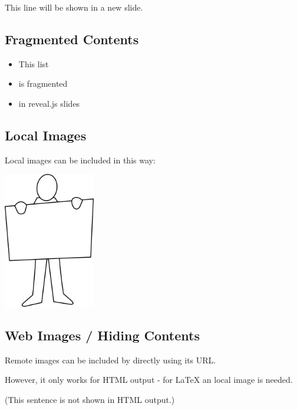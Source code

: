 \documentclass[10pt,article]{article}
\begin{document}
This line will be shown in a new slide.
\subsection{Fragmented Contents}
\label{sec:org0a59814}
\begin{itemize}
\item This list
\item is fragmented
\item in reveal.js slides
\end{itemize}
\subsection{Local Images}
\label{sec:org42ec809}
Local images can be included in this way:

\begin{center}
\includegraphics[width=4cm]{../../../Assets/Images/Misc/affiche.png}
\end{center}

\subsection{Web Images / Hiding Contents}
\label{sec:orgd6f9897}
Remote images can be included by directly using its URL. 

However, it only works for HTML output - for \LaTeX{} an local image is needed.

(This sentence is not shown in HTML output.)
\end{document}

